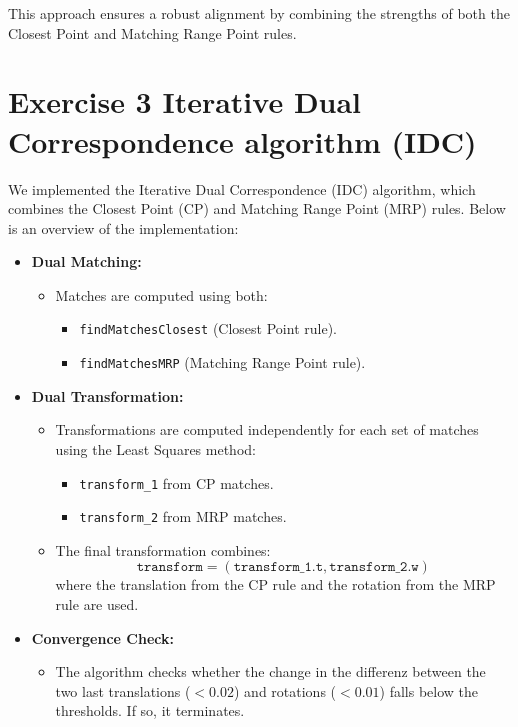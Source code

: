 \documentclass[template,12pt,a4paper,enabledeprecatedfontcommands]{template}
\begin{document}
This approach ensures a robust alignment by combining the strengths of both the Closest Point and Matching Range Point rules.



\section{Exercise 3 Iterative Dual Correspondence algorithm (IDC)}

We implemented the Iterative Dual Correspondence (IDC) algorithm, which combines the Closest Point (CP) and Matching Range Point (MRP) rules. Below is an overview of the implementation:

\begin{itemize}
    \item \textbf{Dual Matching:}
    \begin{itemize}
        \item Matches are computed using both:
        \begin{itemize}
            \item \texttt{findMatchesClosest} (Closest Point rule).
            \item \texttt{findMatchesMRP} (Matching Range Point rule).
        \end{itemize}
    \end{itemize}
    
    \item \textbf{Dual Transformation:}
    \begin{itemize}
        \item Transformations are computed independently for each set of matches using the Least Squares method:
        \begin{itemize}
            \item \texttt{transform\_1} from CP matches.
            \item \texttt{transform\_2} from MRP matches.
        \end{itemize}
        \item The final transformation combines:
        \[
        \texttt{transform} = (\texttt{transform\_1.t}, \texttt{transform\_2.w})
        \]
        where the translation from the CP rule and the rotation from the MRP rule are used.
    \end{itemize}

    \item \textbf{Convergence Check:}
    \begin{itemize}
        \item The algorithm checks whether the change in the differenz between the two last translations (\(< 0.02\)) and rotations (\(< 0.01\)) falls below the thresholds. If so, it terminates.
    \end{itemize}
\end{itemize}
\end{document}
